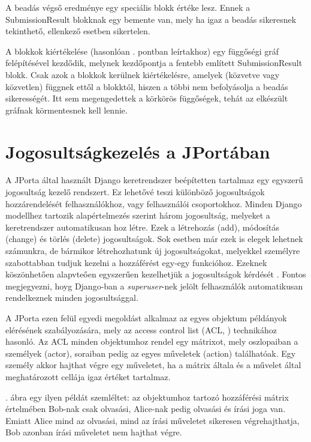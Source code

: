 A beadás végső eredménye egy speciális blokk értéke lesz. Ennek a SubmissionResult blokknak egy bemente van, mely ha igaz a beadás sikeresnek tekinthető, ellenkező esetben sikertelen.

A blokkok kiértékelése (hasonlóan . pontban leírtakhoz) egy függőségi gráf felépítésével kezdődik, melynek kezdőpontja a fentebb említett SubmissionResult blokk. Csak azok a blokkok kerülnek kiértékelésre, amelyek (közvetve vagy közvetlen) függnek ettől a blokktól, hiszen a többi nem befolyásolja a beadás sikerességét.  Itt sem megengedettek a körkörös függőségek, tehát az elkészült gráfnak körmentesnek kell lennie.

\section{Jogosultságkezelés a JPortában}\label{subsection:permissions}

A JPorta által használt Django keretrendszer beépítetten tartalmaz egy egyszerű jogosultság kezelő rendszert. Ez lehetővé teszi különböző jogosultságok hozzárendelését felhasználókhoz, vagy felhasználói csoportokhoz. Minden Django modellhez \cite{DjangoModel} tartozik alapértelmezés szerint három jogosultság, melyeket a keretrendszer automatikusan hoz létre. Ezek a létrehozás (add), módosítás (change) és törlés (delete) jogosultságok. Sok esetben már ezek is elegek lehetnek számunkra, de bármikor létrehozhatunk új jogosultságokat, melyekkel személyre szabottabban tudjuk kezelni a hozzáférést egy-egy funkcióhoz. Ezeknek köszönhetően alapvteően egyszerűen kezelhetjük a jogosultságok kérdését \cite{DjangoAuth}. Fontos megjegyezni, hoyg Django-ban a \textit{superuser}-nek jelölt felhasználók automatikusan rendelkeznek minden jogosultsággal.

A JPorta ezen felül egyedi megoldást alkalmaz az egyes objektum példányok elérésének szabályozására, mely az access control list (ACL, \cite{ACL}) technikához hasonló. Az ACL minden objektumhoz rendel egy mátrixot, mely oszlopaiban a személyek (actor), soraiban pedig az egyes műveletek (action) találhatóak. Egy személy akkor hajthat végre egy műveletet, ha a mátrix általa és a művelet által meghatározott cellája igaz értéket tartalmaz.

. ábra egy ilyen példát szemléltet: az objektumhoz tartozó hozzáférési mátrix értelmében Bob-nak csak olvasási, Alice-nak pedig olvasási és írási joga van. Emiatt Alice mind az olvasási, mind az írási műveletet sikeresen végrehajthatja, Bob azonban írási műveletet nem hajthat végre.

